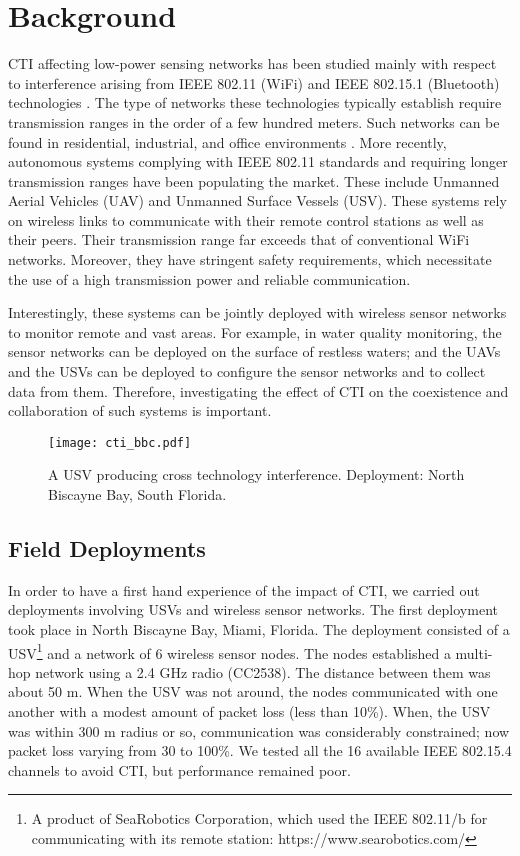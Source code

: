 \section{Background}
\label{sec:background}

CTI affecting low-power sensing networks has been studied mainly with respect to interference arising from IEEE 802.11 (WiFi) and IEEE 802.15.1 (Bluetooth) technologies \cite{chi2019concurrent, li2017webee}. The type of networks these technologies typically establish require transmission ranges in the order of a few hundred meters. Such networks can be found in residential, industrial, and office environments \cite{grimaldi2020autonomous, elias2014cross}. More recently, autonomous systems complying with IEEE 802.11 standards and requiring longer transmission ranges have been populating the market. These include Unmanned Aerial Vehicles (UAV) and Unmanned Surface Vessels (USV). These systems rely on wireless links to communicate with their remote control stations as well as their peers. Their transmission range far exceeds that of conventional WiFi networks. Moreover, they have stringent safety requirements, which necessitate the use of a high transmission power and reliable communication.

Interestingly, these systems can be jointly deployed with wireless sensor networks to monitor remote and vast areas. For example, in water quality monitoring, the sensor networks can be deployed on the surface of restless waters; and the UAVs and the USVs can be deployed to configure the sensor networks and to collect data from them. Therefore, investigating the effect of CTI on the coexistence and collaboration of such systems is important.  

\begin{figure}[t!]
	\centering
	\texttt{[image: cti\_bbc.pdf]}
	\caption{A USV producing cross technology interference. Deployment: North Biscayne Bay, South Florida.}
	\label{fig:mmu}
\end{figure}

\subsection{Field Deployments}

In order to have a first hand experience of the impact of CTI, we carried out deployments involving USVs and wireless sensor networks. The first deployment took place in North Biscayne Bay, Miami, Florida. The deployment consisted of a USV\footnote{A product of SeaRobotics Corporation, which used the IEEE 802.11/b for communicating with its remote station: https://www.searobotics.com/} and a network of 6 wireless sensor nodes. The nodes established a multi-hop network using a 2.4 GHz radio (CC2538). The distance between them was about 50 m. When the USV was not around, the nodes communicated with one another with a modest amount of packet loss (less than 10\%). When, the USV was within 300 m radius or so, communication was considerably constrained; now packet loss varying from 30 to 100\%. We tested all the 16 available IEEE 802.15.4 channels to avoid CTI, but performance remained poor. 

